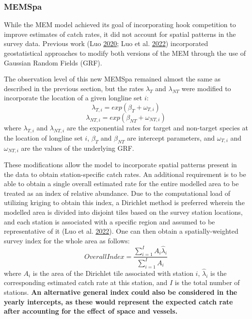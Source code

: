\documentclass[12pt]{article}\usepackage[]{graphicx}\usepackage[]{color}
\begin{document}
\hypertarget{memspa}{%
\subsubsection{MEMSpa}\label{memspa}}

While the MEM model achieved its goal of incorporating hook competition to improve estimates of catch rates, it did not account for spatial patterns in the survey data. Previous work (Luo \protect\hyperlink{ref-Luo2020}{2020}; Luo et al. \protect\hyperlink{ref-Luo2022}{2022}) incorporated geostatistical approaches to modify both versions of the MEM through the use of Gaussian Random Fields (GRF).

The observation level of this new MEMSpa remained almost the same as described in the previous section, but the rates \(\lambda_T\) and \(\lambda_{NT}\) were modified to incorporate the location of a given longline set \(i\):
\begin{equation}
\lambda_{T,i} = exp(\beta_T+\omega_{T,i})
\end{equation} \begin{equation}
\lambda_{NT,i} = exp(\beta_{NT}+\omega_{NT,i})
\end{equation}
where \(\lambda_{T,i}\) and \(\lambda_{NT,i}\) are the exponential rates for target and non-target species at the location of longline set \(i\), \(\beta_T\) and \(\beta_{NT}\) are intercept parameters, and \(\omega_{T,i}\) and \(\omega_{NT,i}\) are the values of the underlying GRF.

These modifications allow the model to incorporate spatial patterns present in the data to obtain station-specific catch rates. An additional requirement is to be able to obtain a single overall estimated rate for the entire modelled area to be treated as an index of relative abundance. Due to the computational load of utilizing kriging to obtain this index, a Dirichlet method is preferred wherein the modelled area is divided into disjoint tiles based on the survey station locations, and each station is associated with a specific region and assumed to be representative of it (Luo et al. \protect\hyperlink{ref-Luo2022}{2022}). One can then obtain a spatially-weighted survey index for the whole area as follows:
\begin{equation}
Overall Index = \frac{\sum_{i=1}^I A_i \hat{\lambda}_i}{\sum_{i=1}^I A_i}
\end{equation}
where \(A_i\) is the area of the Dirichlet tile associated with station \(i\), \(\hat{\lambda}_i\) is the corresponding estimated catch rate at this station, and \(I\) is the total number of stations. \textbf{An alternative general index could also be considered in the yearly intercepts, as these would represent the expected catch rate after accounting for the effect of space and vessels.}
\end{document}
